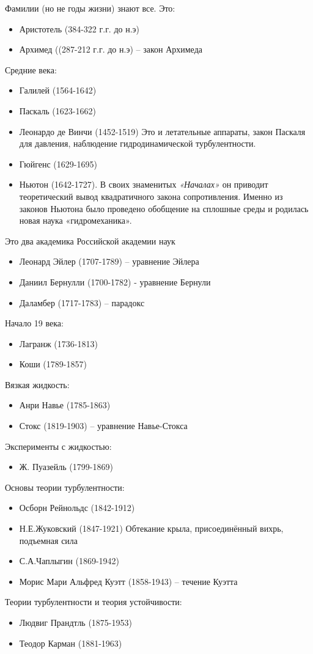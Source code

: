 Фамилии (но не годы жизни) знают все. Это:
\begin{itemize}
	\item Аристотель (384-322 г.г. до н.э)
	\item Архимед ((287-212 г.г. до н.э) – закон Архимеда
\end{itemize}
	Средние века:
\begin{itemize}
	\item Галилей (1564-1642)
	\item Паскаль (1623-1662) 
	\item Леонардо де Винчи (1452-1519)
	Это и летательные аппараты, закон Паскаля для давления, наблюдение гидродинамической турбулентности.
	\item Гюйгенс (1629-1695)
	\item Ньютон (1642-1727). В своих знаменитых \emph{«Началах»} он приводит теоретический вывод квадратичного закона сопротивления. Именно из законов Ньютона было проведено обобщение на сплошные среды и родилась новая наука «гидромеханика».
\end{itemize}
Это два академика Российской академии наук
\begin{itemize}
	\item Леонард Эйлер (1707-1789) – уравнение Эйлера
	\item Даниил Бернулли (1700-1782) -  уравнение Бернули
	\item Даламбер (1717-1783) – парадокс
\end{itemize}
Начало 19 века:
\begin{itemize}
	\item Лагранж (1736-1813)
	\item Коши (1789-1857)
\end{itemize}
Вязкая жидкость:
\begin{itemize}
	\item Анри Навье  (1785-1863)
	\item Стокс (1819-1903) – уравнение Навье-Стокса
\end{itemize}
Эксперименты с жидкостью:
\begin{itemize}
	\item Ж. Пуазейль (1799-1869)
\end{itemize}
Основы теории турбулентности:
\begin{itemize}
	\item Осборн Рейнольдс (1842-1912)
	\item Н.Е.Жуковский (1847-1921) Обтекание крыла, присоединённый вихрь, подъемная сила
	\item С.А.Чаплыгин (1869-1942)
	\item Морис Мари Альфред Куэтт  (1858-1943) – течение Куэтта
\end{itemize}
Теории турбулентности и теория устойчивости:
\begin{itemize}
	\item Людвиг Прандтль  (1875-1953)
	\item Теодор Карман (1881-1963)
\end{itemize}

